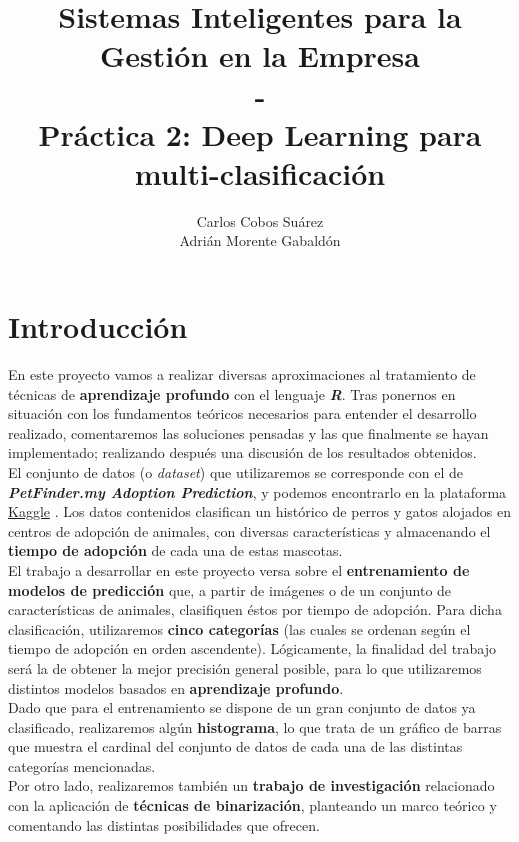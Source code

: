 \documentclass[]{article}
\title{Sistemas Inteligentes para la Gestión en la Empresa\\-\\Práctica 2: Deep Learning para multi-clasificación}
\author{Carlos Cobos Suárez\\Adrián Morente Gabaldón}
\begin{document}
\maketitle
\newpage
\tableofcontents
\newpage

\section{Introducción}

En este proyecto vamos a realizar diversas aproximaciones al tratamiento de técnicas de \textbf{aprendizaje profundo} con el lenguaje \textbf{\textit{R}}. Tras ponernos en situación con los fundamentos teóricos necesarios para entender el desarrollo realizado, comentaremos las soluciones pensadas y las que finalmente se hayan implementado; realizando después una discusión de los resultados obtenidos.\\

El conjunto de datos (o \textit{dataset}) que utilizaremos se corresponde con el de \textbf{\textit{PetFinder.my Adoption Prediction}}, y podemos encontrarlo en la plataforma \href{https://kaggle.com}{Kaggle} \cite{petfinder-dataset}. Los datos contenidos clasifican un histórico de perros y gatos alojados en centros de adopción de animales, con diversas características y almacenando el \textbf{tiempo de adopción} de cada una de estas mascotas.\\

El trabajo a desarrollar en este proyecto versa sobre el \textbf{entrenamiento de modelos de predicción} que, a partir de imágenes o de un conjunto de características de animales, clasifiquen éstos por tiempo de adopción. Para dicha clasificación, utilizaremos \textbf{cinco categorías} (las cuales se ordenan según el tiempo de adopción en orden ascendente). Lógicamente, la finalidad del trabajo será la de obtener la mejor precisión general posible, para lo que utilizaremos distintos modelos basados en \textbf{aprendizaje profundo}.\\

Dado que para el entrenamiento se dispone de un gran conjunto de datos ya clasificado, realizaremos algún \textbf{histograma}, lo que trata de un gráfico de barras que muestra el cardinal del conjunto de datos de cada una de las distintas categorías mencionadas.\\

Por otro lado, realizaremos también un \textbf{trabajo de investigación} relacionado con la aplicación de \textbf{técnicas de binarización}, planteando un marco teórico y comentando las distintas posibilidades que ofrecen.
\end{document}

